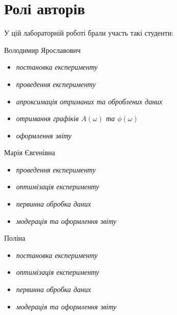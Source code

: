 \chapter*{Ролі авторів} 

У цій лабораторній роботі брали участь такі студенти:
\begin{itemize}
 Володимир Ярославович
\begin{itemize}
    \item\textit{постановка експерименту}
    \item\textit{проведення експерименту}
    \item\textit{апроксимація отриманих та оброблених даних}
    \item\textit{отримання графіків $A(\omega)$ та $\phi(\omega)$}
    \item\textit{оформлення звіту}
\end{itemize}
 Марія Євгенівна
\begin{itemize}
    \item\textit{проведення експерименту}
    \item\textit{оптимізація експерименту}
    \item\textit{первинна обробка даних}
    \item\textit{модерація та оформлення звіту}
\end{itemize}
 Поліна
\begin{itemize}
    \item\textit{постановка експерименту}
    \item\textit{оптимізація експерименту}
    \item\textit{первинна обробка даних}
    \item\textit{модерація та оформлення звіту}

\end{itemize}
\end{itemize}